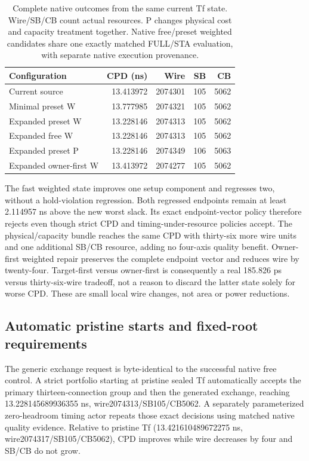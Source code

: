 \begin{table}[t]
\centering\small
\caption{Complete native outcomes from the same current Tf state. Wire/SB/CB count actual resources. P changes physical cost and capacity treatment together. Native free/preset weighted candidates share one exactly matched FULL/STA evaluation, with separate native execution provenance.}
\begin{tabular}{lrrrr}
\hline
Configuration & CPD (ns) & Wire & SB & CB\\
\hline
Current source & 13.413972 & 2074301 & 105 & 5062\\
Minimal preset W & 13.777985 & 2074321 & 105 & 5062\\
Expanded preset W & 13.228146 & 2074313 & 105 & 5062\\
Expanded free W & 13.228146 & 2074313 & 105 & 5062\\
Expanded preset P & 13.228146 & 2074349 & 106 & 5063\\
Expanded owner-first W & 13.413972 & 2074277 & 105 & 5062\\
\hline
\end{tabular}
\end{table}

The fast weighted state improves one setup component and regresses two, without a hold-violation regression. Both regressed endpoints remain at least 2.114957 ns above the new worst slack. Its exact endpoint-vector policy therefore rejects even though strict CPD and timing-under-resource policies accept. The physical/capacity bundle reaches the same CPD with thirty-six more wire units and one additional SB/CB resource, adding no four-axis quality benefit. Owner-first weighted repair preserves the complete endpoint vector and reduces wire by twenty-four. Target-first versus owner-first is consequently a real 185.826 ps versus thirty-six-wire tradeoff, not a reason to discard the latter state solely for worse CPD. These are small local wire changes, not area or power reductions.

\subsection{Automatic pristine starts and fixed-root requirements}
The generic exchange request is byte-identical to the successful native free control. A strict portfolio starting at pristine sealed Tf automatically accepts the primary thirteen-connection group and then the generated exchange, reaching 13.228145689936355 ns, wire2074313/SB105/CB5062. A separately parameterized zero-headroom timing actor repeats those exact decisions using matched native quality evidence. Relative to pristine Tf (13.421610489672275 ns, wire2074317/SB105/CB5062), CPD improves while wire decreases by four and SB/CB do not grow.

